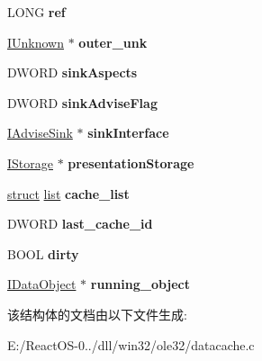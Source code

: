 \begin{DoxyCompactItemize}
L\+O\+NG {\bfseries ref}
\item 
\mbox{\label{struct_data_cache_aae0a58581ae7bd8d20d5a47d146efa89}} 
\hyperlink{interface_i_unknown}{I\+Unknown} $\ast$ {\bfseries outer\+\_\+unk}
\item 
\mbox{\label{struct_data_cache_ace1452e94d2468900f8f746623f76011}} 
D\+W\+O\+RD {\bfseries sink\+Aspects}
\item 
\mbox{\label{struct_data_cache_ae76e87e8036e1b76228dd7089201c62a}} 
D\+W\+O\+RD {\bfseries sink\+Advise\+Flag}
\item 
\mbox{\label{struct_data_cache_a48968b3d64d9dd2803d08bae8de6c235}} 
\hyperlink{interface_i_advise_sink}{I\+Advise\+Sink} $\ast$ {\bfseries sink\+Interface}
\item 
\mbox{\label{struct_data_cache_aa1fc6e989e8881dfbd32b9434c9ba92d}} 
\hyperlink{interface_i_storage}{I\+Storage} $\ast$ {\bfseries presentation\+Storage}
\item 
\mbox{\label{struct_data_cache_a1cbeb36c610f1d73fe2fb7c3c2c67e89}} 
\hyperlink{interfacestruct}{struct} \hyperlink{classlist}{list} {\bfseries cache\+\_\+list}
\item 
\mbox{\label{struct_data_cache_a8b1bb585afb1cc1a9c471d8d143efc51}} 
D\+W\+O\+RD {\bfseries last\+\_\+cache\+\_\+id}
\item 
\mbox{\label{struct_data_cache_a87492c91ca457ecdd410a87c2891a302}} 
B\+O\+OL {\bfseries dirty}
\item 
\mbox{\label{struct_data_cache_af8dfce10e46b9cbefd6eddb4b8d50029}} 
\hyperlink{interface_i_data_object}{I\+Data\+Object} $\ast$ {\bfseries running\+\_\+object}
\end{DoxyCompactItemize}


该结构体的文档由以下文件生成\+:\begin{DoxyCompactItemize}
\item 
E\+:/\+React\+O\+S-\/0../dll/win32/ole32/datacache.\+c\end{DoxyCompactItemize}
